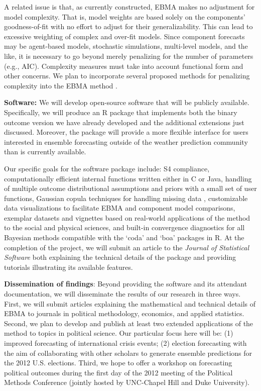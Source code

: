 \documentclass[pdftex,12pt,fullpage,oneside]{amsart}
\begin{document}
A related issue is that, as currently constructed, EBMA makes no
adjustment for model complexity. That is, model weights are based
solely on the components' goodness-of-fit with no effort to adjust for
their generalizability. This can lead to excessive weighting of
complex and over-fit models. Since component forecasts may be
agent-based models, stochastic simulations, multi-level models, and
the like, it is necessary to go beyond merely penalizing for the
number of parameters (e.g., AIC). Complexity measures must take into
account functional form and other concerns. We plan to incorporate
several proposed methods for penalizing complexity into the EBMA
method \citep[c.f.,][]{Pitt:2002a, Pitt:2002b, Spiegelhalter:2002}.

\textbf{Software:} We will develop open-source software that will be
publicly available.  Specifically, we will produce an R package that
implements both the binary outcome version we have already developed
and the additional extensions just discussed.  Moreover, the package
will provide a more flexible interface for users interested in
ensemble forecasting outside of the weather prediction community than
is currently available.  

Our specific goals for the software package include: S4 compliance,
computationally efficient internal functions written either in C or
Java, handling of multiple outcome distributional assumptions and
priors with a small set of user functions, Gaussian copula techniques
for handling missing data \citep{Hoff:2007}, customizable data
visualizations to facilitate EBMA and component model comparisons,
exemplar datasets and vignettes based on real-world applications of
the method to the social and physical sciences, and built-in
convergence diagnostics for all Bayesian methods compatible with the
`coda' and `boa' packages in R.  At the completion of the project, we
will submit an article to the \textit{Journal of Statistical
  Software} both explaining the technical details of the package and
providing tutorials illustrating its available features.

\textbf{Dissemination of findings}: Beyond providing the software and
its attendant documentation, we will disseminate the results of our
research in three ways.  First, we will submit articles explaining the
mathematical and technical details of EBMA to journals in political
methodology, economics, and applied statistics.  Second, we plan to
develop and publish at least two extended applications of the method
to topics in political science.  Our particular focus here will be:
(1) improved forecasting of international crisis events; (2) election
forecasting with the aim of collaborating with other scholars to
generate ensemble predictions for the 2012 U.S. elections.  Third, we
hope to offer a workshop on forecasting political outcomes during the
first day of the 2012 meeting of the Political Methods Conference
(jointly hosted by UNC-Chapel Hill and Duke University).
\end{document}
